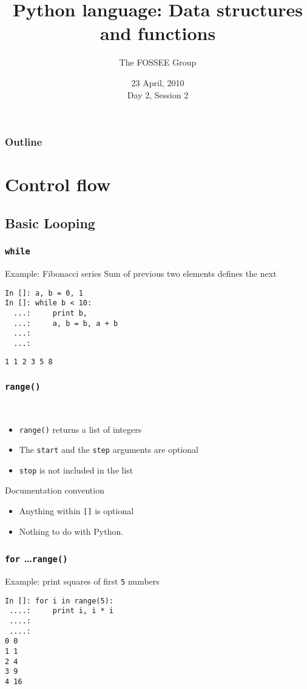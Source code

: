 \documentclass[14pt,compress]{beamer}
\title[Basic Python]{Python language: Data structures and functions}
\author[FOSSEE Team] {The FOSSEE Group}
\institute[IIT Bombay] {Department of Aerospace Engineering\\IIT Bombay}
\date[] {23 April, 2010\\Day 2, Session 2}
\newcommand{\typ}[1]{\lstinline{#1}}
\newcommand{\kwrd}[1]{ \texttt{\textbf{\color{blue}{#1}}}  }
\begin{document}
\begin{frame}
  \titlepage
\end{frame}

\begin{frame}
  \frametitle{Outline}
  \tableofcontents
\end{frame}

\section{Control flow}
\subsection{Basic Looping}
\begin{frame}[fragile]
  \frametitle{\typ{while}}
\begin{block}{Example: Fibonacci series}
  Sum of previous two elements defines the next
\end{block}
  \begin{lstlisting}
In []: a, b = 0, 1
In []: while b < 10:
  ...:     print b,
  ...:     a, b = b, a + b
  ...:
  ...:
\end{lstlisting}
\typ{1 1 2 3 5 8}\\
\end{frame}

\begin{frame}[fragile]
\frametitle{\typ{range()}}
\kwrd{range([start,] stop[, step])}\\
\begin{itemize}
  \item \typ{range()} returns a list of integers
  \item The \typ{start} and the \typ{step} arguments are optional
  \item \typ{stop} is not included in the list
\end{itemize}
\vspace*{.5in}
\begin{block}{Documentation convention}
  \begin{itemize}
    \item \alert{Anything within \typ{[]} is optional}
    \item Nothing to do with Python.
  \end{itemize}
\end{block}
\end{frame}

\begin{frame}[fragile]
  \frametitle{\texttt{for} \ldots \typ{range()}}
Example: print squares of first \typ{5} numbers
  \begin{lstlisting}
In []: for i in range(5):
 ....:     print i, i * i
 ....:
 ....:
0 0
1 1
2 4
3 9
4 16
\end{lstlisting}
\end{frame}
\end{document}
